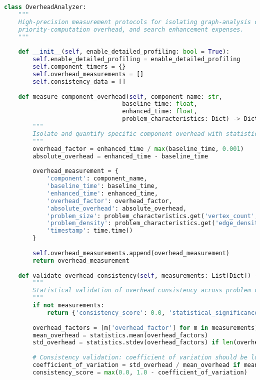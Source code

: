\begin{lstlisting}[language=Python, caption=Overhead Quantification and Consistency Analysis Framework]
class OverheadAnalyzer:
    """
    High-precision measurement protocols for isolating graph-analysis costs,
    priority-computation overhead, and search enhancement expenses.
    """
    
    def __init__(self, enable_detailed_profiling: bool = True):
        self.enable_detailed_profiling = enable_detailed_profiling
        self.component_timers = {}
        self.overhead_measurements = []
        self.consistency_data = []
    
    def measure_component_overhead(self, component_name: str, 
                                 baseline_time: float, 
                                 enhanced_time: float,
                                 problem_characteristics: Dict) -> Dict:
        """
        Isolate and quantify specific component overhead with statistical validation.
        """
        overhead_factor = enhanced_time / max(baseline_time, 0.001)
        absolute_overhead = enhanced_time - baseline_time
        
        overhead_measurement = {
            'component': component_name,
            'baseline_time': baseline_time,
            'enhanced_time': enhanced_time,
            'overhead_factor': overhead_factor,
            'absolute_overhead': absolute_overhead,
            'problem_size': problem_characteristics.get('vertex_count', 0),
            'problem_density': problem_characteristics.get('edge_density', 0.0),
            'timestamp': time.time()
        }
        
        self.overhead_measurements.append(overhead_measurement)
        return overhead_measurement
    
    def validate_overhead_consistency(self, measurements: List[Dict]) -> Dict:
        """
        Statistical validation of overhead consistency across problem categories.
        """
        if not measurements:
            return {'consistency_score': 0.0, 'statistical_significance': False}
        
        overhead_factors = [m['overhead_factor'] for m in measurements]
        mean_overhead = statistics.mean(overhead_factors)
        std_overhead = statistics.stdev(overhead_factors) if len(overhead_factors) > 1 else 0.0
        
        # Consistency validation: coefficient of variation should be low
        coefficient_of_variation = std_overhead / mean_overhead if mean_overhead > 0 else float('inf')
        consistency_score = max(0.0, 1.0 - coefficient_of_variation)
        

\end{lstlisting}
